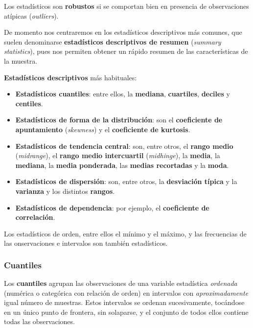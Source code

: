 \documentclass[11pt]{article}
\providecommand{\tightlist}{%
      \setlength{\itemsep}{0pt}\setlength{\parskip}{0pt}}
\begin{document}
Los estadísticos son \textbf{robustos} si se comportan bien en presencia
de observaciones atípicas (\emph{outliers}).

De momento nos centraremos en los estadísticos descriptivos más comunes,
que suelen denominarse \textbf{estadísticos descriptivos de resumen}
(\emph{summary statistics}), pues nos permiten obtener un rápido resumen
de las características de la muestra.

    \textbf{Estadísticos descriptivos} más habituales:

\begin{itemize}
\tightlist
\item
  \textbf{Estadísticos cuantiles}: entre ellos, la \textbf{mediana},
  \textbf{cuartiles}, \textbf{deciles} y \textbf{centiles}.
\item
  \textbf{Estadísticos de forma de la distribución}: son el
  \textbf{coeficiente de apuntamiento} (\emph{skewness}) y el
  \textbf{coeficiente de kurtosis}.
\item
  \textbf{Estadísticos de tendencia central}: son, entre otros, el
  \textbf{rango medio} (\emph{midrange}), el \textbf{rango medio
  intercuartil} (\emph{midhinge}), la \textbf{media}, la
  \textbf{mediana}, la \textbf{media ponderada}, las \textbf{medias
  recortadas} y la \textbf{moda}.
\item
  \textbf{Estadísticos de dispersión}: son, entre otros, la
  \textbf{desviación típica} y la \textbf{varianza} y los distintos
  \textbf{rangos}.
\item
  \textbf{Estadísticos de dependencia}: por ejemplo, el
  \textbf{coeficiente de correlación}.
\end{itemize}

Los estadísticos de orden, entre ellos el mínimo y el máximo, y las
frecuencias de las onservaciones e intervalos son también estadísticos.

    \subsubsection*{Cuantiles}\label{cuantiles}

Los \textbf{cuantiles} agrupan las observaciones de una variable
estadística \emph{ordenada} (numérica o categórica con relación de
orden) en intervalos con \emph{aproximadamente} igual número de
muestras. Estos intervalos se ordenan sucesivamente, tocándose en un
único punto de frontera, sin solaparse, y el conjunto de todos ellos
contiene todas las observaciones.
\end{document}

